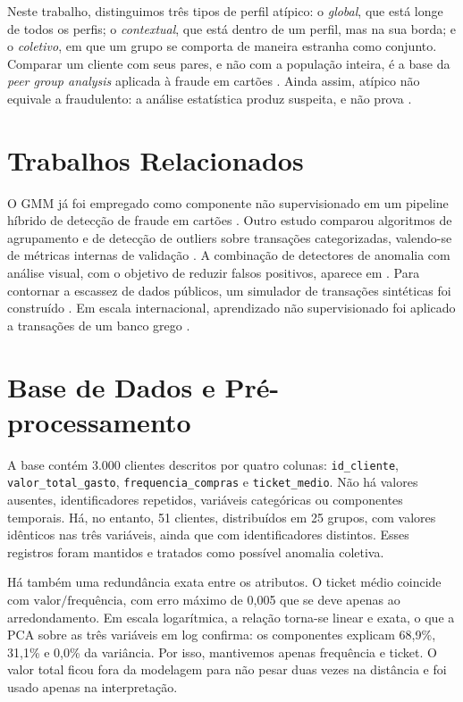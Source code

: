 \documentclass[12pt]{article}
\begin{document}
Neste trabalho, distinguimos três tipos de perfil atípico: o \emph{global}, que está longe de todos os
perfis; o \emph{contextual}, que está dentro de um perfil, mas na sua borda; e o \emph{coletivo}, em que
um grupo se comporta de maneira estranha como conjunto. Comparar um cliente com seus pares, e não com a
população inteira, é a base da \emph{peer group analysis} aplicada à fraude em cartões
\cite{weston2008peer}. Ainda assim, atípico não equivale a fraudulento: a análise estatística produz
suspeita, e não prova \cite{bolton2002fraud}.

\section{Trabalhos Relacionados}
O GMM já foi empregado como componente não supervisionado em um pipeline híbrido de detecção de fraude
em cartões \cite{silva2025gmm}. Outro estudo comparou algoritmos de agrupamento e de detecção de outliers
sobre transações categorizadas, valendo-se de métricas internas de validação \cite{oliveira2023spending}.
A combinação de detectores de anomalia com análise visual, com o objetivo de reduzir falsos positivos,
aparece em \cite{torres2020visual}. Para contornar a escassez de dados públicos, um simulador de
transações sintéticas foi construído \cite{santos2024sintetico}. Em escala internacional, aprendizado
não supervisionado foi aplicado a transações de um banco grego \cite{karnavou2025fraud}.

\section{Base de Dados e Pré-processamento}
\label{sec:eda}
A base contém 3.000 clientes descritos por quatro colunas: \texttt{id\_cliente},
\texttt{valor\_total\_gasto}, \texttt{frequencia\_compras} e \texttt{ticket\_medio}. Não há valores
ausentes, identificadores repetidos, variáveis categóricas ou componentes temporais. Há, no entanto, 51
clientes, distribuídos em 25 grupos, com valores idênticos nas três variáveis, ainda que com
identificadores distintos. Esses registros foram mantidos e tratados como possível anomalia coletiva.

Há também uma redundância exata entre os atributos. O ticket médio coincide com
$\text{valor}/\text{frequência}$, com erro máximo de 0,005 que se deve apenas ao arredondamento. Em
escala logarítmica, a relação torna-se linear e exata, o que a PCA sobre as três variáveis em log
confirma: os componentes explicam 68,9\%, 31,1\% e 0,0\% da variância. Por isso, mantivemos apenas
frequência e ticket. O valor total ficou fora da modelagem para não pesar duas vezes na distância e foi
usado apenas na interpretação.
\end{document}
